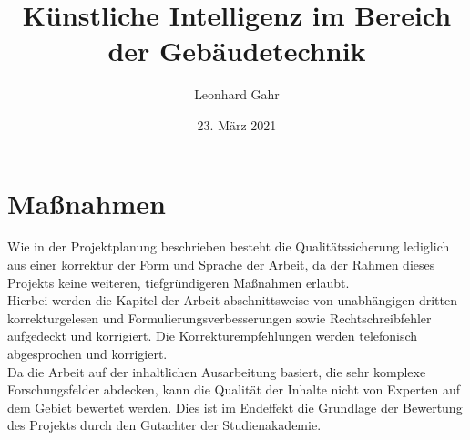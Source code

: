 \documentclass[
	ngerman,
	12pt, %
]{pm}
\title{Künstliche Intelligenz im Bereich der Gebäudetechnik}
\author{Leonhard Gahr} %
\date{23. März 2021} %
\institute{\texttt{[image: ../img/sie-logo.png]}\hfill\texttt{[image: ../img/dhbw-logo]}} %
\begin{document}
\maketitle %


\section*{\large Maßnahmen}
Wie in der Projektplanung beschrieben besteht die Qualitätssicherung lediglich aus einer korrektur der Form und Sprache der Arbeit, da der Rahmen dieses Projekts keine weiteren, tiefgründigeren Maßnahmen erlaubt.\\
Hierbei werden die Kapitel der Arbeit abschnittsweise von unabhängigen dritten korrekturgelesen und Formulierungsverbesserungen sowie Rechtschreibfehler aufgedeckt und korrigiert. Die Korrekturempfehlungen werden telefonisch abgesprochen und korrigiert.\\
Da die Arbeit auf der inhaltlichen Ausarbeitung basiert, die sehr komplexe Forschungsfelder abdecken, kann die Qualität der Inhalte nicht von Experten auf dem Gebiet bewertet werden. Dies ist im Endeffekt die Grundlage der Bewertung des Projekts durch den Gutachter der Studienakademie.
\end{document}
